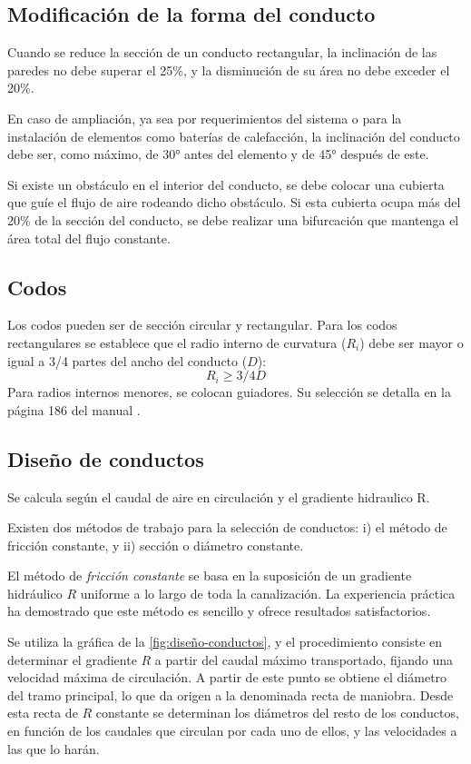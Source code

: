 \subsection{Modificación de la forma del conducto}
Cuando se reduce la sección de un conducto rectangular, la inclinación de las paredes no debe superar el 25\%, y la disminución de su área no debe exceder el 20\%.

En caso de ampliación, ya sea por requerimientos del sistema o para la instalación de elementos como baterías de calefacción, la inclinación del conducto debe ser, como máximo, de 30° antes del elemento y de 45° después de este.

Si existe un obstáculo en el interior del conducto, se debe colocar una cubierta que guíe el flujo de aire rodeando dicho obstáculo. Si esta cubierta ocupa más del 20\% de la sección del conducto, se debe realizar una bifurcación que mantenga el área total del flujo constante.

\subsection{Codos}

Los codos pueden ser de sección circular y rectangular. Para los codos rectangulares se establece que el radio interno de curvatura ($R_i$) debe ser mayor o igual a 3/4 partes del ancho del conducto ($D$):
\begin{equation}
	R_i \geq 3/4 D
\end{equation}
Para radios internos menores, se colocan guiadores. Su selección se detalla en la página 186 del manual \parencite{quadri2007manual}.

\subsection{Diseño de conductos}

Se calcula según el caudal de aire en circulación y el gradiente hidraulico R.

Existen dos métodos de trabajo para la selección de conductos: i) el método de fricción constante, y ii) sección o diámetro constante.

El método de \emph{fricción constante} se basa en la suposición de un gradiente hidráulico $R$ uniforme a lo largo de toda la canalización. La experiencia práctica ha demostrado que este método es sencillo y ofrece resultados satisfactorios.

Se utiliza la gráfica de la \autoref{fig:diseño-conductos}, y el procedimiento consiste en determinar el gradiente $R$ a partir del caudal máximo transportado, fijando una velocidad máxima de circulación. A partir de este punto se obtiene el diámetro del tramo principal, lo que da origen a la denominada recta de maniobra. Desde esta recta de $R$ constante se determinan los diámetros del resto de los conductos, en función de los caudales que circulan por cada uno de ellos, y las velocidades a las que lo harán.

